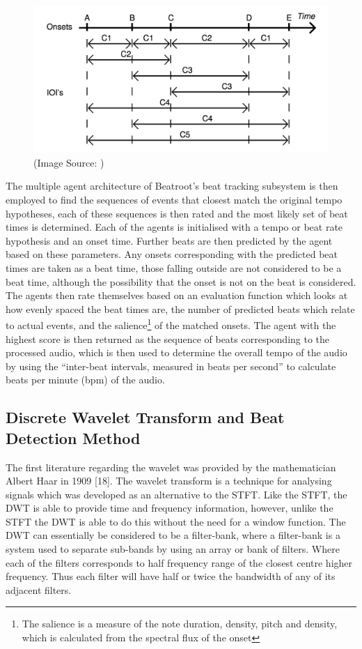 \documentclass[a4paper, 11pt]{article}
\begin{document}
\begin{figure}[ht]
	\centering
	\includegraphics[scale=0.25]{br-clusters}
	\caption{(Image Source: \cite{dixon4})}
	\label{fig: br-clusters}
\end{figure}

The multiple agent architecture of Beatroot's beat tracking subsystem is then employed to find the sequences of events that closest match the original tempo hypotheses, each of these sequences is then rated and the most likely set of beat times is determined. Each of the agents is initialised with a tempo or beat rate hypothesis and an onset time. Further beats are then predicted by the agent based on these parameters. Any onsets corresponding with the predicted beat times are taken as a beat time, those falling outside are not considered to be a beat time, although the possibility that the onset is not on the beat is considered. The agents then rate themselves based on an evaluation function which looks at how evenly spaced the beat times are, the number of predicted beats which relate to actual events, and the salience\footnote{The salience is a measure of the note duration, density, pitch and density\cite{dixon1}, which is calculated from the spectral flux of the onset\cite{dixon4}} of the matched onsets. The agent with the highest score is then returned as the sequence of beats corresponding to the processed audio\cite{dixon4}, which is then used to determine the overall tempo of the audio by using the ``inter-beat intervals, measured in beats per second''\cite{dixon1} to calculate beats per minute (bpm) of the audio.


\subsection{Discrete Wavelet Transform and Beat Detection Method}
The first literature regarding the wavelet was provided by the mathematician Albert Haar in 1909 [18]. The wavelet transform is a technique for analysing signals which was developed as an alternative to the STFT\cite{tzane1}. Like the STFT, the DWT is able to provide time and frequency information, however, unlike the STFT the DWT is able to do this without the need for a window function. The DWT can essentially be considered to be a filter-bank, where a filter-bank is a system used to separate sub-bands by using an array or bank of filters. Where each of the filters corresponds to half frequency range of the closest centre higher frequency. Thus each filter will have half or twice the bandwidth of any of its adjacent filters. 
\end{document}
